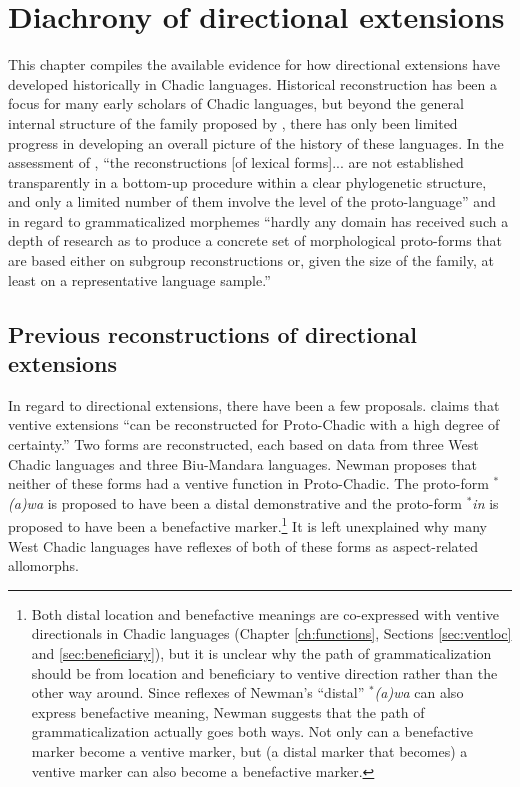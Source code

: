 \chapter{Diachrony of directional extensions} \label{ch:diachrony} 

This chapter compiles the available evidence for how directional extensions have developed historically in Chadic languages. Historical reconstruction has been a focus for many early scholars of Chadic languages, but beyond the general internal structure of the family proposed by \citet{newmanChadicClassificationReconstructions1977}, there has only been limited progress in developing an overall picture of the history of these languages. In the assessment of \citet[343--344]{guldemannHistoricalLinguisticsGenealogical2018}, ``the reconstructions [of lexical forms]... are not established transparently in a bottom-up procedure within a clear phylogenetic structure, and only a limited number of them involve the level of the proto-language'' and in regard to grammaticalized morphemes ``hardly any domain has received such a depth of research as to produce a concrete set of morphological proto-forms that are based either on subgroup reconstructions or, given the size of the family, at least on a representative language sample.''

\section{Previous reconstructions of directional extensions}

In regard to directional extensions, there have been a few proposals. \citet[275]{newmanChadicExtensionsPredative1977} claims that ventive extensions ``can be reconstructed for Proto-Chadic with a high degree of certainty.'' Two forms are reconstructed, each based on data from three West Chadic languages and three Biu-Mandara languages. Newman proposes that neither of these forms had a ventive function in Proto-Chadic. The proto-form $^\ast$\textit{(a)wa} is proposed to have been a distal demonstrative and the proto-form  $^\ast$\textit{in} is proposed to have been a benefactive marker.\footnote{Both distal location and benefactive meanings are co-expressed with ventive directionals in Chadic languages (Chapter \ref{ch:functions}, Sections \ref{sec:ventloc} and \ref{sec:beneficiary}), but it is unclear why the path of grammaticalization should be from location and beneficiary to ventive direction rather than the other way around. Since reflexes of Newman's ``distal'' $^\ast$\textit{(a)wa} can also express benefactive meaning, Newman suggests that the path of grammaticalization actually goes both ways. Not only can a benefactive marker become a ventive marker, but (a distal marker that becomes) a ventive marker can also become a benefactive marker.} It is left unexplained why many West Chadic languages have reflexes of both of these forms as aspect-related allomorphs. 

